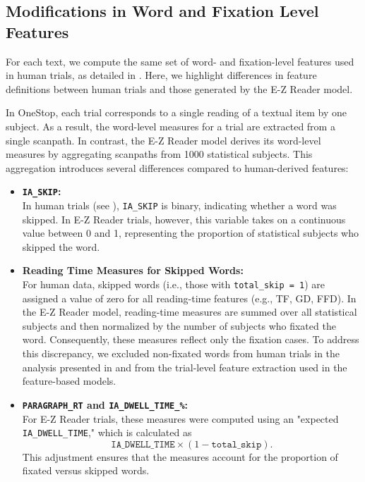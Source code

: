 \subsection{Modifications in Word and Fixation Level Features}
For each text, we compute the same set of word- and fixation-level features used in human trials, as detailed in . Here, we highlight differences in feature definitions between human trials and those generated by the \mbox{E-Z} Reader model.

In OneStop, each trial corresponds to a single reading of a textual item by one subject. As a result, the word-level measures for a trial are extracted from a single scanpath. In contrast, the E-Z Reader model derives its word-level measures by aggregating scanpaths from 1000 statistical subjects. This aggregation introduces several differences compared to human-derived features:

\begin{itemize}
    \item \textbf{\texttt{IA\_SKIP}:} \\
    In human trials (see ), \texttt{IA\_SKIP} is binary, indicating whether a word was skipped. In E-Z Reader trials, however, this variable takes on a continuous value between 0 and 1, representing the proportion of statistical subjects who skipped the word.
    
    \item \textbf{Reading Time Measures for Skipped Words:} \\
    For human data, skipped words (i.e., those with \texttt{total\_skip = 1}) are assigned a value of zero for all reading-time features (e.g., TF, GD, FFD). In the E-Z Reader model, reading-time measures are summed over all statistical subjects and then normalized by the number of subjects who fixated the word. Consequently, these measures reflect only the fixation cases. To address this discrepancy, we excluded non-fixated words from human trials in the analysis presented in  and from the trial-level feature extraction used in the feature-based models.
    
    \item \textbf{\texttt{PARAGRAPH\_RT} and \texttt{IA\_DWELL\_TIME\_\%}:} \\
    For E-Z Reader trials, these measures were computed using an "expected \texttt{IA\_DWELL\_TIME}," which is calculated as
    \[
    \texttt{IA\_DWELL\_TIME} \times \left(1 - \texttt{total\_skip}\right).
    \]
    This adjustment ensures that the measures account for the proportion of fixated versus skipped words.
\end{itemize}


